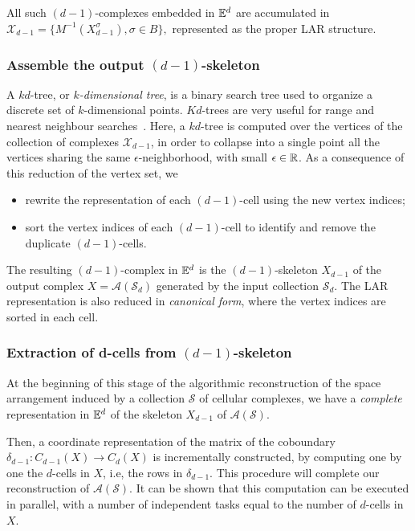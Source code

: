 All such $(d-1)$-complexes embedded in $\mathbb{E}^d$ are accumulated in $
\mathcal{X}_{d-1} = \{  M^{-1}( X_{d-1}^\sigma ), \sigma\in B \},
$ represented as the proper LAR structure.

\subsubsection{Assemble the output $(d-1)$-skeleton}

A $kd$-tree, or \emph{$k$-dimensional tree}, is a binary search tree used to organize a discrete set of $k$-dimensional points.  $Kd$-trees are very useful for range and nearest neighbour searches~\cite{Bentley:1975:MBS:361002.361007}.
Here, a $kd$-tree is computed over the vertices of the collection of
complexes $\mathcal{X}_{d-1}$, in order to
  collapse into a single point all the vertices sharing the same
  $\epsilon$-neighborhood, with small $\epsilon\in \mathbb{R}$. 
As a consequence of this reduction of the vertex set, we
\begin{itemize}
\item
  rewrite the representation of each $(d-1)$-cell using the new vertex
  indices;
\item
  sort the vertex indices of each $(d-1)$-cell to identify and remove
  the duplicate $(d-1)$-cells.
\end{itemize}

The resulting $(d-1)$-complex in $\mathbb{E}^d$ is the $(d-1)$-skeleton
$X_{d-1}$ of the output complex $X = \mathcal{A}(\mathcal{S}_d)$ generated by the
input collection $\mathcal{S}_d$. The LAR representation is also reduced in \emph{canonical form}, where the vertex indices are sorted in each cell.



\subsubsection{Extraction of d-cells from $(d-1)$-skeleton}
\label{sect:alg-1}

At the beginning of this stage of the algorithmic reconstruction of the space arrangement induced by a collection $\mathcal{S}$ of cellular complexes, we have a \emph{complete}~\cite{Requicha:1980:RRS:356827.356833} representation in $\mathbb{E}^d$ of the skeleton $X_{d-1}$  of $\mathcal{A}(\mathcal{S})$.

Then, a coordinate representation of the matrix of the coboundary
$\delta_{d-1}: C_{d-1}(X) \to C_d(X)$ is incrementally constructed, by
computing one by one the $d$-cells in $X$, i.e, the rows in $\delta_{d-1}$. This procedure will complete our reconstruction of $\mathcal{A}(\mathcal{S})$. It can be shown that this computation can be executed in parallel, with a number of independent tasks equal to the number of $d$-cells in $X$.

